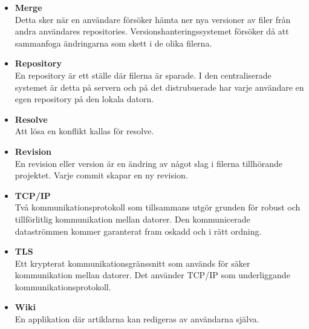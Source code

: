 \begin{itemize}
	\item \textbf{Merge}
	\\Detta sker när en användare försöker hämta ner nya versioner av filer från andra användares repositories. Versionshanteringssystemet försöker då att sammanfoga ändringarna som skett i de olika filerna.
			
	\item \textbf{Repository}
	\\En repository är ett ställe där filerna är sparade. I den centraliserade systemet är detta på servern och på det distrubuerade har varje användare en egen repository på den lokala datorn.

	\item \textbf{Resolve}
	\\Att lösa en konflikt kallas för resolve.
	
	\item \textbf{Revision}
	\\En revision eller version är en ändring av något slag i filerna tillhörande projektet. Varje commit skapar en ny revision.

        \item \textbf{TCP/IP}
        \\Två kommunikationsprotokoll som tillsammans utgör grunden för robust och tillförlitlig kommunikation mellan datorer. Den kommunicerade dataströmmen kommer garanterat fram oskadd och i rätt ordning.

        \item \textbf{TLS}
        \\Ett krypterat kommunikationsgränssnitt som används för säker kommunikation mellan datorer. Det använder TCP/IP som underliggande kommunikationsprotokoll.
	
	\item \textbf{Wiki} \\
	En applikation där artiklarna kan redigeras av användarna själva.
\end{itemize}

